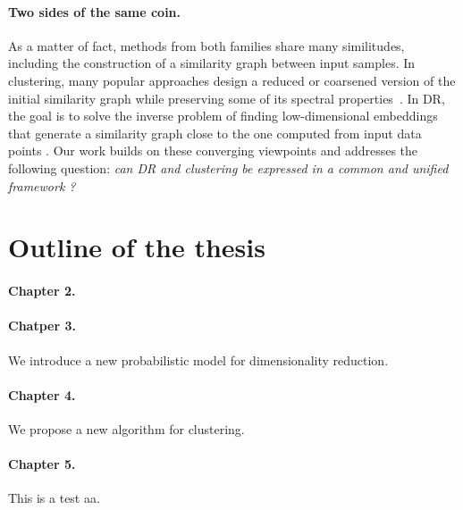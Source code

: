 \paragraph{Two sides of the same coin.} As a matter of fact, methods from both families share many similitudes, %
including the construction of a similarity graph between input samples. In clustering, many popular approaches design a reduced or coarsened version of the initial similarity graph while preserving some of its spectral properties~\citep{von2007tutorial, schaeffer2007graph}. 
In DR, the goal is to solve the inverse problem of finding low-dimensional embeddings that generate a similarity graph close to the %
one computed from input data points \citep{ham2004kernel,hinton2002stochastic}.
Our work builds on these converging viewpoints and addresses the following question: \emph{can DR and clustering  be expressed in a common and unified framework ?}


\section*{Outline of the thesis}

\paragraph{Chapter 2.}

\paragraph{Chatper 3.} We introduce a new probabilistic model for dimensionality reduction.

\paragraph{Chapter 4.} We propose a new algorithm for clustering.


\paragraph{Chapter 5.} 

\text


\begin{rem2}
	This is a test aa.
\end{rem2}


